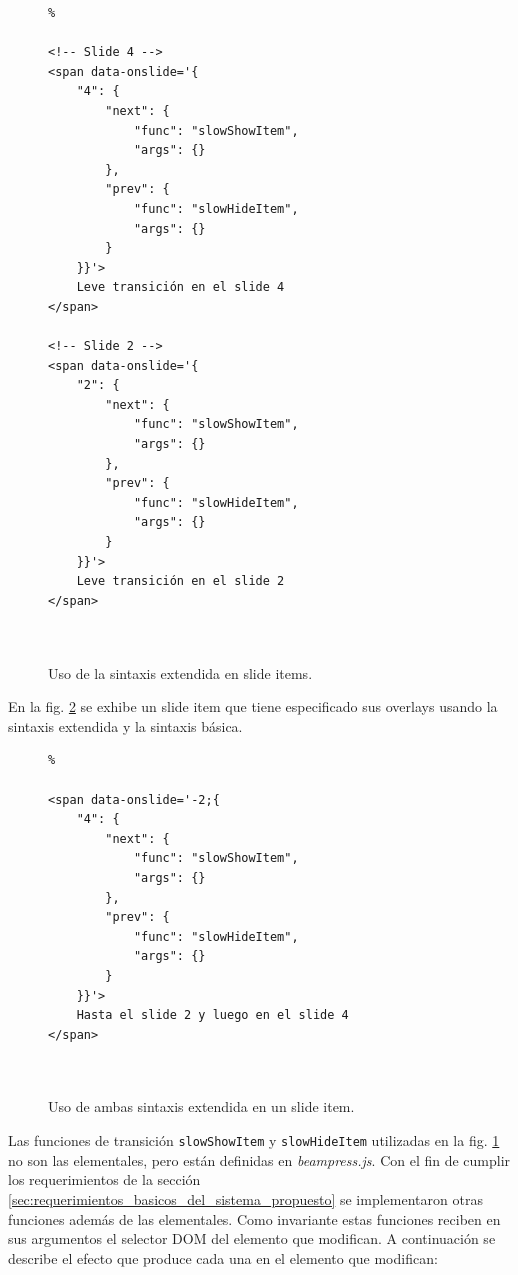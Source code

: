 			\begin{figure}[htb]%
				\begin{lstlisting}%

<!-- Slide 4 -->
<span data-onslide='{
    "4": {
        "next": {
            "func": "slowShowItem",
            "args": {}
        },
        "prev": {
            "func": "slowHideItem",
            "args": {}
        }
    }}'>
	Leve transición en el slide 4
</span>

<!-- Slide 2 -->
<span data-onslide='{
    "2": {
        "next": {
            "func": "slowShowItem",
            "args": {}
        },
        "prev": {
            "func": "slowHideItem",
            "args": {}
        }
    }}'>
	Leve transición en el slide 2
</span>

			
				\end{lstlisting}
				\caption{Uso de la sintaxis extendida en slide items.} 
				\label{fig:extended_syntax_html}
			\end{figure}

			En la fig. \ref{fig:basic_and_extended_syntax_html} se exhibe un slide item que tiene especificado sus overlays usando la sintaxis extendida y la sintaxis básica.


			\begin{figure}[htb]%
				\begin{lstlisting}%

<span data-onslide='-2;{
    "4": {
        "next": {
            "func": "slowShowItem",
            "args": {}
        },
        "prev": {
            "func": "slowHideItem",
            "args": {}
        }
    }}'>
	Hasta el slide 2 y luego en el slide 4
</span>

			
				\end{lstlisting}
				\caption{Uso de ambas sintaxis extendida en un slide item.} 
				\label{fig:basic_and_extended_syntax_html}
			\end{figure}			


			Las funciones de transición \texttt{slowShowItem} y \texttt{slowHideItem} utilizadas en la fig. \ref{fig:extended_syntax_html} no son las elementales, pero están definidas en \textit{beampress.js}. Con el fin de cumplir los requerimientos de la sección \ref{sec:requerimientos_basicos_del_sistema_propuesto} se implementaron otras funciones además de las elementales. Como invariante estas funciones reciben en sus argumentos el selector DOM del elemento que modifican. A continuación se describe el efecto que produce cada una en el elemento que modifican:


